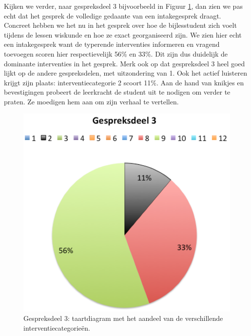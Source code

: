 \documentclass[a4paper,12pt]{article}
\theoremstyle{definition}
\begin{document}
Kijken we verder, naar gespreksdeel 3 bijvoorbeeld in Figuur \ref{8}, dan zien 
we pas echt dat het gesprek de volledige gedaante van een intakegesprek draagt. Concreet hebben we het nu in het gesprek over 
 hoe de bijlesstudent zich voelt tijdens de lessen wiskunde en hoe ze exact 
 georganiseerd zijn. We zien hier echt een intakegesprek want de typerende 
 interventies informeren en vragend toevoegen scoren hier
 respectievelijk 56\% en 33\%. Dit zijn dus duidelijk de dominante interventies in het gesprek. Merk ook op dat gespreksdeel 3 heel goed lijkt op de andere gespreksdelen, met uitzondering van 1. 
 Ook het actief luisteren krijgt zijn plaats: interventiecategorie 2 scoort 
 11\%. Aan de hand van knikjes en bevestigingen probeert de leerkracht de 
 student uit te nodigen om verder te praten. Ze moedigen hem aan om zijn verhaal 
 te vertellen.
 \begin{figure}[h]
  \centering
  \includegraphics[scale=0.6]{grafiek8.png}\caption{Gespreksdeel 3: taartdiagram met het aandeel van de verschillende interventiecategorieën.}\label{8}
\end{figure}
\newpage
\end{document}
